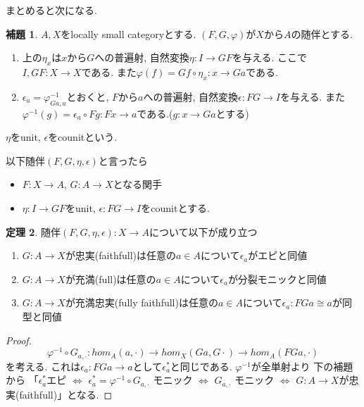 \documentclass[dvipdfmx,a4paper,11pt]{report}
\theoremstyle{definition}
\newtheorem{thm}{定理}
\newtheorem{lem}[thm]{補題}
\begin{document}
まとめると次になる. 
 \begin{tcolorbox}
 [colback = white, colframe = green!35!black, fonttitle = \bfseries,breakable = true]
\begin{lem}
$A,X$をlocally small categoryとする.
$(F,G,\varphi)$が$X$から$A$の随伴とする.
\begin{enumerate}
\item 上の$\eta_{x}$は$x$から$G$への普遍射, 自然変換$\eta : I \to GF$を与える. ここで$I, GF: X \to X$である.
また$\varphi(f ) = Gf \circ \eta_x : x \to Ga$である.
\item $\epsilon_a = \varphi^{-1}_{Ga,a}$とおくと, $F$から$a$への普遍射, 自然変換$\epsilon : FG \to I$を与える. また$\varphi^{-1}(g) = \epsilon_{a} \circ Fg:  Fx \to a$である.($g : x \to Ga$とする)
\end{enumerate}
$\eta$をunit, $\epsilon$をcounitという. 
\end{lem}
\end{tcolorbox}
以下随伴$(F,G,\eta,\epsilon)$と言ったら
\begin{itemize}
\item $F :X \to A$, $G : A \to X$となる関手
\item $\eta : I \to GF$をunit, $\epsilon : FG \to I$をcounitとする.
\end{itemize}

 \begin{tcolorbox}
 [colback = white, colframe = green!35!black, fonttitle = \bfseries,breakable = true]
\begin{thm}
\label{thm-adjoint-fullyfaithfull}
随伴$(F,G,\eta,\epsilon): X \to A$について以下が成り立つ
\begin{enumerate}
\item $G : A \to X$が忠実(faithfull)は任意の$a \in A$について$\epsilon_a$がエピと同値
\item $G : A \to X$が充満(full)は任意の$a \in A$について$\epsilon_a$が分裂モニックと同値
\item $G : A \to X$が充満忠実(fully faithfull)は任意の$a \in A$について$\epsilon_a : FG a \cong a$が同型と同値
\end{enumerate}
\end{thm}
\end{tcolorbox}
\begin{proof}
$$
\varphi^{-1} \circ G_{a, \cdot}:
hom_{A}(a, \cdot)
\to 
hom_{X}(Ga, G\cdot)
\to 
hom_{A}(FGa, \cdot)
$$
を考える. これは$\epsilon_a : FGa \to a$として$\epsilon_{a}^{*}$と同じである.
$\varphi^{-1}$が全単射より 
下の補題から
「$\epsilon_{a}^{*}$エピ $\Leftrightarrow$ $\epsilon_{a}^{*} = \varphi^{-1} \circ G_{a, \cdot}$ モニック
$\Leftrightarrow$ $ G_{a, \cdot}$ モニック $\Leftrightarrow$ $G : A \to X$が忠実(faithfull)」となる.
\end{proof}
\end{document}
